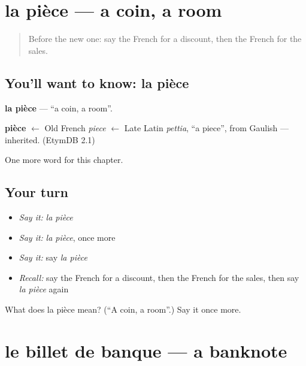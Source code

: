 \section[la pièce]{la pièce — a coin, a room}

\label{lesson:FR-C198-piece}



\begin{quote}
Before the new one: say the French for a discount, then the French for the sales.
\end{quote}

\subsection*{You'll want to know: la pièce}
\textbf{la pièce} — \textquotedblleft{}a coin, a room\textquotedblright{}.

\begin{cousinweb}
\textbf{pièce} $\leftarrow$ Old French \emph{piece} $\leftarrow$ Late Latin \emph{pettia}, \textquotedblleft{}a piece\textquotedblright{}, from Gaulish — inherited. (EtymDB 2.1)
\end{cousinweb}

\begin{grammarlens}[title={What you've built}]
One more word for this chapter.
\end{grammarlens}

\subsection*{Your turn}
\begin{itemize}
\raggedright
  \item \emph{Say it:} \emph{la pièce}
  \item \emph{Say it:} \emph{la pièce}, once more
  \item \emph{Say it:} say \emph{la pièce}
  \item \emph{Recall:} say the French for a discount, then the French for the sales, then say \emph{la pièce} again
\end{itemize}

\begin{tcolorbox}[breakable,colback=teal!4,colframe=teal!35!black,title={Before you move on}]
What does la pièce mean? (\textquotedblleft{}A coin, a room\textquotedblright{}.) Say it once more.
\end{tcolorbox}
\section[le billet de banque]{le billet de banque — a banknote}

